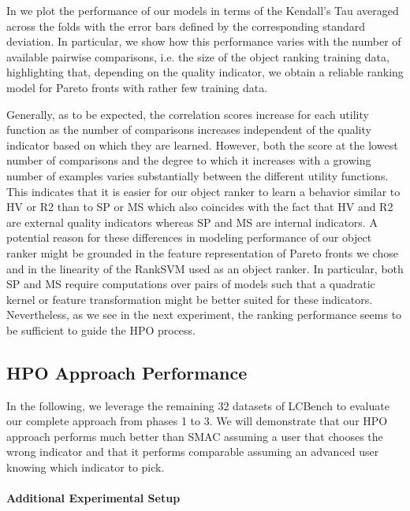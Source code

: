 In  we plot the performance of our models in terms of the Kendall's Tau averaged across the folds with the error bars defined by the corresponding standard deviation. In particular, we show how this performance varies with the number of available pairwise comparisons, i.e. the size of the object ranking training data, highlighting that, depending on the quality indicator, we obtain a reliable ranking model for Pareto fronts with rather few training data.

Generally, as to be expected, the correlation scores increase for each utility function as the number of comparisons increases independent of the quality indicator based on which they are learned. However, both the score at the lowest number of comparisons and the degree to which it increases with a growing number of examples varies substantially between the different utility functions. This indicates that it is easier for our object ranker to learn a behavior similar to HV or R2 than to SP or MS which also coincides with the fact that HV and R2 are external quality indicators whereas SP and MS are internal indicators.
A potential reason for these differences in modeling performance of our object ranker might be grounded in the feature representation of Pareto fronts we chose and in the linearity of the RankSVM used as an object ranker. In particular, both SP and MS require computations over pairs of models such that a quadratic kernel or feature transformation might be better suited for these indicators. Nevertheless, as we see in the next experiment, the ranking performance seems to be sufficient to guide the HPO process.

\subsection{HPO Approach Performance}
\label{moo-sssec:end_to_end}

In the following, we leverage the remaining 32 datasets of LCBench to evaluate our complete approach from phases 1 to 3. We will demonstrate that our HPO approach performs much better than SMAC assuming a user that chooses the wrong indicator and that it performs comparable assuming an advanced user knowing which indicator to pick.

\paragraph{Additional Experimental Setup}

